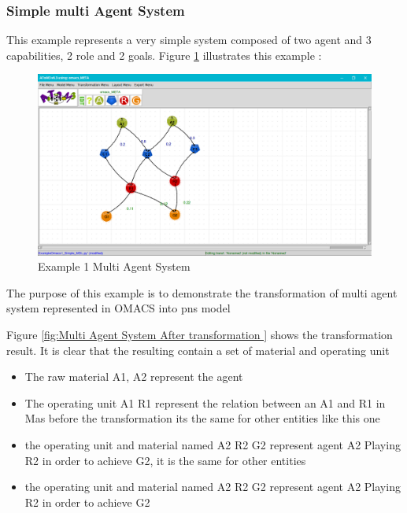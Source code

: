 \subsubsection{Simple multi Agent System }
This example represents a very simple system composed of two agent and 3 capabilities, 2 role and 2 goals.
 Figure \ref{fig:Example 1 Multi Agent System } illustrates this example :
\begin{figure}[th]
	\centering
 	\includegraphics[scale=0.3]{ch3/img/omacs_model}
	\caption{\label{fig:Example 1 Multi Agent System }Example 1 Multi Agent System}
\end{figure} 

The purpose of this example is to demonstrate the transformation of multi agent system represented in OMACS into pns model

Figure \ref{fig:Multi Agent System After transformation } shows the transformation result.
It is clear that the resulting contain a set of material and operating unit
 
\begin{itemize}

\newcommand{\localtextbulletone}{\textcolor{gray}{\raisebox{.45ex}{\rule{.6ex}{.6ex}}}}
\renewcommand{\labelitemi}{\localtextbulletone}
\item The raw material A1, A2 represent the agent 
\item The operating unit A1 R1 represent the relation between an A1 and R1 
in Mas before the transformation its the same for other entities like this one
\item the operating unit and material named A2 R2 G2 represent agent A2 Playing R2 in order to achieve G2, it is the same for other entities 

\item the operating unit and material named A2 R2 G2 represent agent A2 Playing R2 in order to achieve G2 
\end{itemize}
 
